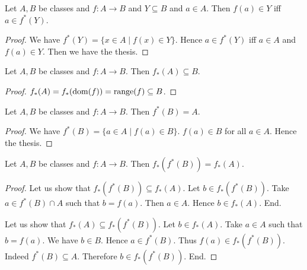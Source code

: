 \documentclass[10pt]{article}
\begin{document}
  \begin{forthel}
    \begin{proposition}[id=FOUNDATIONS_07_6362984433582080,printid]
      Let $A, B$ be classes and $f : A \to B$ and $Y \subseteq B$ and $a \in A$.
      Then $f(a) \in Y$ iff $a \in f^{*}(Y)$.
    \end{proposition}
    \begin{proof}
      We have $f^{*}(Y) = \{ x \in A \mid f(x) \in Y \}$.
      Hence $a \in f^{*}(Y)$ iff $a \in A$ and $f(a) \in Y$.
      Then we have the thesis.
    \end{proof}
  \end{forthel}

  \begin{forthel}
    \begin{proposition}[id=FOUNDATIONS_07_6730546254184448,printid]
      Let $A, B$ be classes and $f : A \to B$.
      Then $f_{*}(A) \subseteq B$.
    \end{proposition}
    \begin{proof}
      $f_{*}(A)
        = f_{*}(\operatorname{dom}(f))
        = \textrm{range}(f)
        \subseteq B$.
    \end{proof}
  \end{forthel}

  \begin{forthel}
    \begin{proposition}[id=FOUNDATIONS_07_6541963008409600,printid]
      Let $A, B$ be classes and $f : A \to B$.
      Then $f^{*}(B) = A$.
    \end{proposition}
    \begin{proof}
      We have $f^{*}(B) = \{ a \in A \mid f(a) \in B \}$.
      $f(a) \in B$ for all $a \in A$.
      Hence the thesis.
    \end{proof}
  \end{forthel}

  \begin{forthel}
    \begin{proposition}[id=FOUNDATIONS_07_1913313581596672,printid]
      Let $A, B$ be classes and $f : A \to B$.
      Then $f_{*}(f^{*}(B)) = f_{*}(A)$.
    \end{proposition}
    \begin{proof}
      Let us show that $f_{*}(f^{*}(B)) \subseteq f_{*}(A)$.
        Let $b \in f_{*}(f^{*}(B))$.
        Take $a \in f^{*}(B) \cap A$ such that $b = f(a)$.
        Then $a \in A$.
        Hence $b \in f_{*}(A)$.
      End.

      Let us show that $f_{*}(A) \subseteq f_{*}(f^{*}(B))$.
        Let $b \in f_{*}(A)$.
        Take $a \in A$ such that $b = f(a)$.
        We have $b \in B$.
        Hence $a \in f^{*}(B)$.
        Thus $f(a) \in f_{*}(f^{*}(B))$.
        Indeed $f^{*}(B) \subseteq A$.
        Therefore $b \in f_{*}(f^{*}(B))$.
      End.
    \end{proof}
  \end{forthel}
\end{document}
